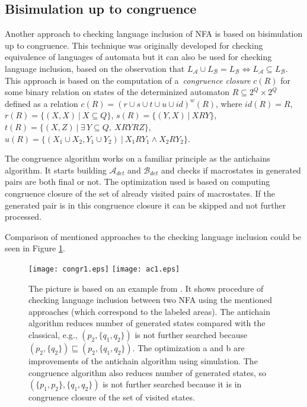 \documentclass{eeict}
\begin{document}
\subsection{Bisimulation up to congruence}
Another approach to checking language inclusion of NFA is based on bisimulation up to congruence. This technique was originally developed for
checking equivalence of languages of automata but it can
also be used for checking language inclusion, based on the observation that $L_\mathcal{A}\cup L_\mathcal{B}= L_\mathcal{B} 
\Leftrightarrow L_\mathcal{A}\subseteq L_\mathcal{B}$. 
This approach is based on the computation of a~\emph{congruence closure} $c(R)$ 
for some binary relation on states of the determinized automaton $R \subseteq 2^Q\times 2^Q$ defined 
as a relation $c(R)=(r\cup s\cup t \cup u\cup id)^{w}(R)$, where $id(R)=R$, 
$r(R)=\{(X,X)\ |\ X\subseteq Q\}$, 
$s(R)=\{(Y,X)\ |\ XRY\}$,\linebreak
$t(R)=\{(X,Z)\ |\ \exists\,Y\subseteq Q,\ XRYRZ\}$,
$u(R)=\{(X_1 \cup X_2,Y_1\cup Y_2)\ |\ X_1 R Y_1 \wedge X_2 R Y_2\}$. 

The congruence algorithm works on a familiar principle as the antichains algorithm. 
It starts building $\mathcal{A}_{det}$ and $\mathcal{B}_{det}$ and checks if macrostates in generated pairs are both
final or not. The optimization used is based on computing congruence closure of the set of already visited pairs of macrostates. 
If the generated pair is in this congruence closure it can be skipped and not further processed.

Comparison of mentioned approaches to the checking language inclusion could be seen in Figure \ref{automata}.
\begin{figure}[bht]
\begin{center}
	\scalebox{1}
	{
		\texttt{[image: congr1.eps]}
		\hspace{0.55cm}
  	\texttt{[image: ac1.eps]}
	}
  \caption{
      \rm{
      \hspace{0.1cm} The picture is based on an example from \cite{tacas10}.
      It shows procedure of checking language inclusion between two NFA using the mentioned approaches (which correspond to the labeled areas).
      The antichain algorithm reduces number of generated states compared with the classical,
      e.g., $(p_2,\{q_1,q_2\})$ is not further searched because $(p_2,\{q_2\}) \sqsubseteq (p_2,\{q_1,q_2\})$. 
      The optimization a and b are improvements of the antichain algorithm using simulation. 
      The congruence algorithm also reduces number of generated states, so $(\{p_1,p_2\},\{q_1,q_2\})$ is not further searched because it is in congruence closure 
      of the set of visited states.}}
  \label{automata}
\end{center}
\end{figure}
\end{document}
